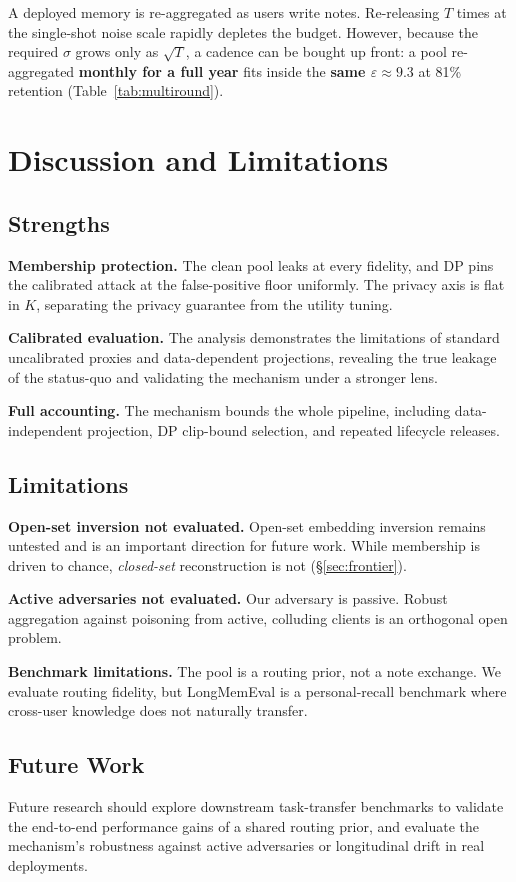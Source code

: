 \documentclass[conference]{IEEEtran}
\theoremstyle{remark}
\newcommand{\eps}{\varepsilon}
\newcommand{\secref}[1]{\S\ref{#1}}
\begin{document}
A deployed memory is re-aggregated as users write notes. Re-releasing $T$ times at the single-shot noise scale rapidly depletes the budget. However, because the required $\sigma$ grows only as $\sqrt{T}$, a cadence can be bought up front: a pool re-aggregated \textbf{monthly for a full year} fits inside the \textbf{same $\eps \approx 9.3$} at 81\% retention (Table~\ref{tab:multiround}).

\section{Discussion and Limitations}\label{sec:discussion}

\subsection{Strengths}
\textbf{Membership protection.} The clean pool leaks at every fidelity, and DP pins the calibrated attack at the false-positive floor uniformly. The privacy axis is flat in $K$, separating the privacy guarantee from the utility tuning.

\textbf{Calibrated evaluation.} The analysis demonstrates the limitations of standard uncalibrated proxies and data-dependent projections, revealing the true leakage of the status-quo and validating the mechanism under a stronger lens.

\textbf{Full accounting.} The mechanism bounds the whole pipeline, including data-independent projection, DP clip-bound selection, and repeated lifecycle releases.

\subsection{Limitations}
\textbf{Open-set inversion not evaluated.} Open-set embedding inversion remains untested and is an important direction for future work. While membership is driven to chance, \emph{closed-set} reconstruction is not (\secref{sec:frontier}).

\textbf{Active adversaries not evaluated.} Our adversary is passive. Robust aggregation against poisoning from active, colluding clients is an orthogonal open problem.

\textbf{Benchmark limitations.} The pool is a routing prior, not a note exchange. We evaluate routing fidelity, but LongMemEval is a personal-recall benchmark where cross-user knowledge does not naturally transfer. 

\subsection{Future Work}
Future research should explore downstream task-transfer benchmarks to validate the end-to-end performance gains of a shared routing prior, and evaluate the mechanism's robustness against active adversaries or longitudinal drift in real deployments.
\end{document}
